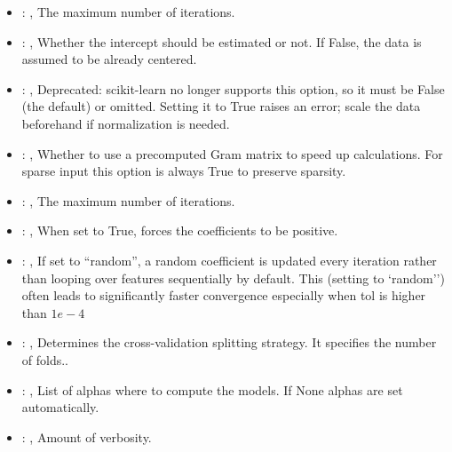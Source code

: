 \begin{itemize}
    \item {}: ,
      The maximum number of iterations.

    \item {}: ,
      Whether the intercept should be estimated or not. If False,
      the data is assumed to be already centered.

    \item {}: ,
      Deprecated: scikit-learn no longer supports this option, so it must be False (the default) or
      omitted.                                                  Setting it to True raises an error;
      scale the data beforehand if normalization is needed.

    \item {}: ,
      Whether to use a precomputed Gram matrix to speed up calculations.
      For sparse input this option is always True to preserve sparsity.

    \item {}: ,
      The maximum number of iterations.

    \item {}: ,
      When set to True, forces the coefficients to be positive.

    \item {}: ,
      If set to ``random'', a random coefficient is updated every iteration
      rather than looping over features sequentially by default. This (setting to `random'')
      often leads to significantly faster convergence especially when tol is higher than $1e-4$

    \item {}: ,
      Determines the cross-validation splitting strategy.
      It specifies the number of folds..

    \item {}: ,
      List of alphas where to compute the models. If None alphas
      are set automatically.

    \item {}: ,
      Amount of verbosity.
  \end{itemize}


